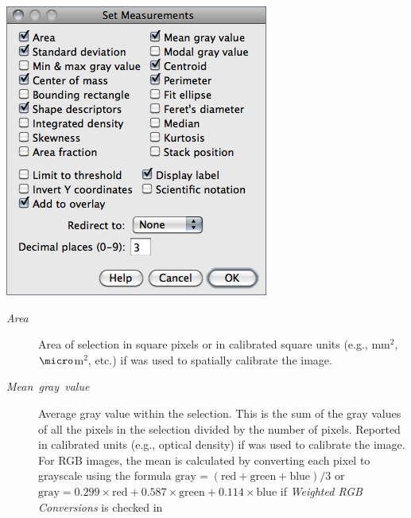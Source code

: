 \begin{minipage}[c][1\totalheight][t]{0.455\columnwidth}%
\includegraphics[scale=0.55]{images/SetMeasurements}%
\end{minipage}%
\begin{minipage}[c][1\totalheight][t]{0.545\columnwidth}%
\begin{description}
\item [{\emph{Area}}] Area of selection in square pixels or in calibrated
square units (e.g., mm$^{2}$, $\micro$m$^{2}$, etc.) if 
was used to spatially calibrate the image. 
\item [{\emph{Mean\ gray\ value}}] Average gray value within the selection.
This is the sum of the gray values of all the pixels in the selection
divided by the number of pixels. Reported in calibrated units (e.g.,
optical density) if 
was used to calibrate the image. For RGB images, the mean is calculated
by converting each pixel to grayscale using the formula $\text{gray}=(\text{red}+\text{green}+\text{blue})/3$
or $\text{gray}=0.299\times\text{red}+0.587\times\text{green}+0.114\times\text{blue}$
if \emph{Weighted RGB Conversions} is checked in \end{description}
%
\end{minipage}
